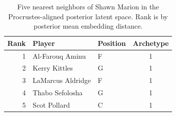 \begin{table}[htbp]
  \centering\small
  \begin{tabular}{rllc}
    \toprule
    Rank & Player & Position & Archetype \\
    \midrule
    1 & Al-Farouq Aminu & F & 1 \\
    2 & Kerry Kittles & G & 1 \\
    3 & LaMarcus Aldridge & F & 1 \\
    4 & Thabo Sefolosha & G & 1 \\
    5 & Scot Pollard & C & 1 \\
    \bottomrule
  \end{tabular}
  \caption{Five nearest neighbors of Shawn Marion in the Procrustes-aligned posterior latent space. Rank is by posterior mean embedding distance.}
  \label{tab:Shawn_Marion_neighbors}
\end{table}

